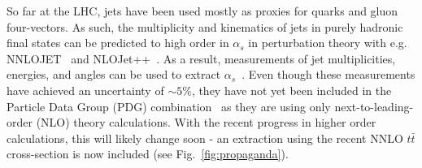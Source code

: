So far at the LHC, jets have been used mostly as proxies for quarks and gluon four-vectors.  As such, the multiplicity and kinematics of jets in purely hadronic final states can be predicted to high order in $\alpha_s$ in perturbation theory with e.g. NNLOJET~\cite{Currie:2016bfm,Currie:2017ctp} and NLOJet++~\cite{Nagy:2001fj,Nagy:2003tz}.  As a result, measurements of jet multiplicities, energies, and angles can be used to extract $\alpha_s$~\cite{ATLAS:2015yaa,Aaboud:2017fml,Khachatryan:2014waa,CMS:2014mna,Chatrchyan:2013txa}.   Even though these measurements have achieved an uncertainty of $\sim 5\%$, they have not yet been included in the Particle Data Group (PDG) combination~\cite{Olive:2016xmw} as they are using only next-to-leading-order (NLO) theory calculations.  With the recent progress in higher order calculations, this will likely change soon - an extraction using the recent NNLO $t\bar{t}$ cross-section is now included (see Fig.~\ref{fig:propaganda}).

